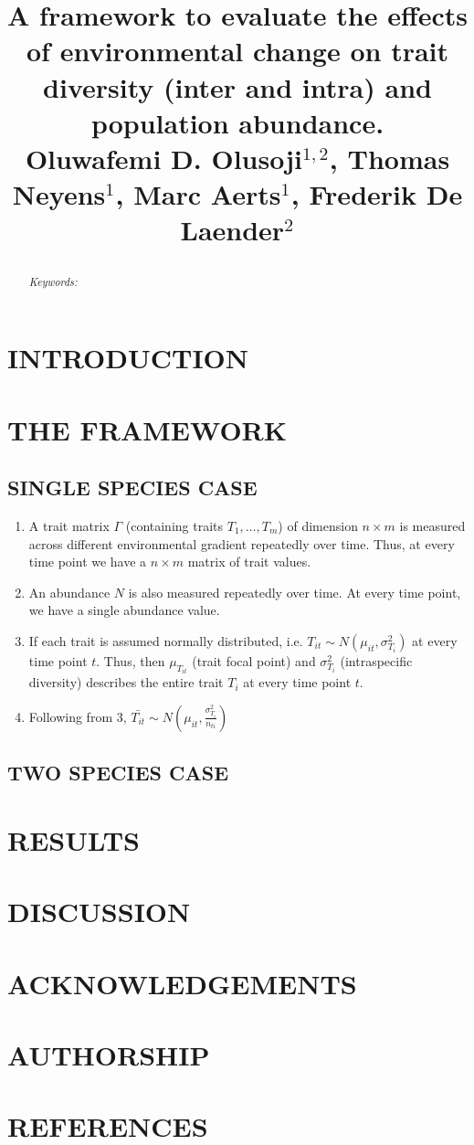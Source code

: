 \documentclass[a4paper,12pt]{article}
\title{
		\begin{flushleft} 
			\Huge{A framework to evaluate the effects of environmental change on trait diversity (inter and intra)
			and population abundance.} \\ 
		\vspace{0.4in} \small{Oluwafemi D. Olusoji$^{1,2}$, Thomas Neyens$^{1}$, Marc Aerts$^{1}$, Frederik De Laender$^{2}$}
		\end{flushleft}
	}
\date{}
\begin{document}
	\maketitle
	\newpage
	\begin{abstract}
			
		\noindent \textit{Keywords: }
	\end{abstract}
	
	
\section*{INTRODUCTION}

\section*{THE FRAMEWORK}

\subsection*{SINGLE SPECIES CASE}

\begin{enumerate}
	\item A trait matrix $\Gamma$ (containing traits $T_1, \ldots, T_m$) of dimension $n \times m$ is measured across different environmental gradient repeatedly over time. Thus, at every time point we have a $n \times m$ matrix of trait values.
	\item An abundance $N$ is also measured repeatedly over time. At every time point, we have a single abundance value.
	\item If each trait is assumed normally distributed, i.e. $T_{it} \sim N(\mu_{it}, \sigma^2_{T_i})$ at every time point $t$. Thus, then $\mu_{T_{it}}$ (trait focal point) and $\sigma^2_{T_i}$ (intraspecific diversity) describes the entire trait $T_{i}$ at every time point $t$.
	\item Following from $3$, $\bar{T_{it}} \sim N(\mu_{it}, \frac{\sigma^2_{T_i}}{n_{ti}})$
\end{enumerate}

\subsection*{TWO SPECIES CASE}

\section*{RESULTS}

\section*{DISCUSSION}

\section*{ACKNOWLEDGEMENTS}

\section*{AUTHORSHIP}

\section*{REFERENCES}
	
	
\end{document}
